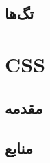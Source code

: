 \documentclass[
  persian,
  letterpaper,
  DIV=11,
  numbers=noendperiod]{scrreprt}
\begin{document}
\chapter{تگ‌ها}\label{ux62aux6afux647ux627}

\part{CSS}

\chapter{مقدمه}\label{ux645ux642ux62fux645ux647-1}


\chapter*{منابع}\label{ux645ux646ux627ux628ux639}


\protect{}\label{refs}
\end{document}
